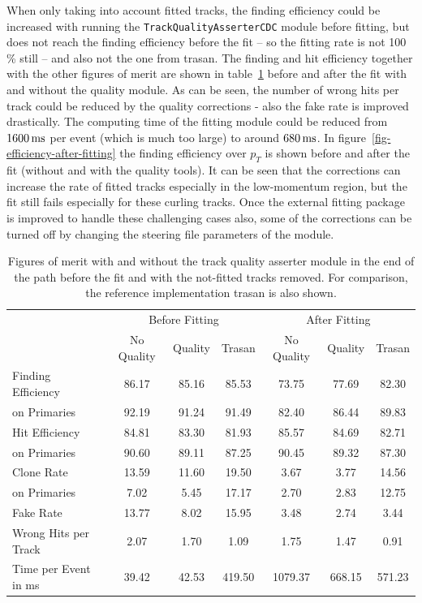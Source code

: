 When only taking into account fitted tracks, the finding efficiency could be increased with running the \texttt{Track\-Quality\-Asserter\-CDC} module before fitting, but does not reach the finding efficiency before the fit -- so the fitting rate is not 100 \% still -- and also not the one from trasan. The finding and hit efficiency together with the other figures of merit are shown in table~\ref{tab-results-after-fitting} before and after the fit with and without the quality module. As can be seen, the number of wrong hits per track could be reduced by the quality corrections - also the fake rate is improved drastically. The computing time of the fitting module could be reduced from $\unit[1600]{ms}$ per event (which is much too large) to around $\unit[680]{ms}$. In figure~\ref{fig-efficiency-after-fitting} the finding efficiency over $p_T$ is shown before and after the fit (without and with the quality tools). It can be seen that the corrections can increase the rate of fitted tracks especially in the low-momentum region, but the fit still fails especially for these curling tracks. Once the external fitting package is improved to handle these challenging cases also, some of the corrections can be turned off by changing the steering file parameters of the module.

\begin{table}
  \caption{Figures of merit with and without the track quality asserter module in the end of the path before the fit and with the not-fitted tracks removed. For comparison, the reference implementation trasan is also shown.}
  \centering
  \begin{tabular}{lcccccc} \toprule
    & \multicolumn{3}{c}{Before Fitting} & \multicolumn{3}{c}{After Fitting} \\ 
    & No Quality & Quality & Trasan & No Quality & Quality & Trasan \\ \midrule
    Finding Efficiency   & 86.17 & 85.16 & 85.53 & 73.75 & 77.69 & 82.30 \\
    \quad on Primaries   & 92.19 & 91.24 & 91.49 & 82.40 & 86.44 & 89.83 \\ 
    Hit Efficiency       & 84.81 & 83.30 & 81.93 & 85.57 & 84.69 & 82.71 \\
    \quad on Primaries   & 90.60 & 89.11 & 87.25 & 90.45 & 89.32 & 87.30 \\ 
    Clone Rate           & 13.59 & 11.60 & 19.50 & 3.67  & 3.77  & 14.56 \\
    \quad on Primaries   & 7.02  & 5.45  & 17.17 & 2.70  & 2.83  & 12.75 \\ 
    Fake Rate            & 13.77 & 8.02  & 15.95 & 3.48  & 2.74  & 3.44 \\ 
    Wrong Hits per Track & 2.07  & 1.70  & 1.09  & 1.75  & 1.47  & 0.91 \\
    Time per Event in ms & 39.42 & 42.53 & 419.50& 1079.37 & 668.15 & 571.23 \\ \bottomrule
  \end{tabular}  
  \label{tab-results-after-fitting}
\end{table}

